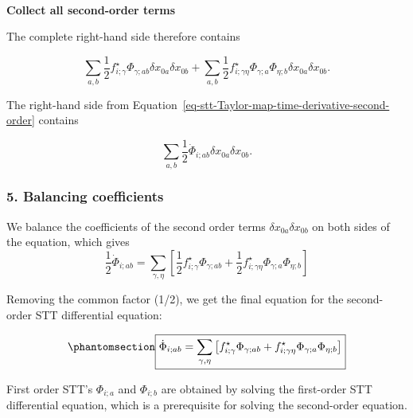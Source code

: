 \documentclass[
  letterpaper,
  DIV=11,
  numbers=noendperiod,
  oneside]{scrartcl}
\makeatletter
\let\oldparagraph\paragraph
\renewcommand{\paragraph}{
    \@ifstar
      \xxxParagraphStar
      \xxxParagraphNoStar
  }
\newcommand{\xxxParagraphStar}[1]{\oldparagraph*{#1}\mbox{}}
\newcommand{\xxxParagraphNoStar}[1]{\oldparagraph{#1}\mbox{}}
\makeatother
\begin{document}
\paragraph{\texorpdfstring{\textbf{Collect all second-order
terms}}{Collect all second-order terms}}\label{collect-all-second-order-terms}

The complete right-hand side therefore contains

\[
\sum_{a,b}\frac12
f^\star_{i;\gamma}
\Phi_{\gamma;ab}
\delta x_{0a}\delta x_{0b}
+
\sum_{a,b}\frac12
f^\star_{i;\gamma\eta}
\Phi_{\gamma;a}
\Phi_{\eta;b}
\delta x_{0a}\delta x_{0b}.
\]

The right-hand side from
Equation~\ref{eq-stt-Taylor-map-time-derivative-second-order} contains

\[
\sum_{a,b}\frac12
\dot\Phi_{i;ab}
\delta x_{0a}\delta x_{0b}.
\]

\subsubsection{5. Balancing
coefficients}\label{balancing-coefficients-1}

We balance the coefficients of the second order terms
\(\delta x_{0a}\delta x_{0b}\) on both sides of the equation, which
gives \[
\frac12\dot\Phi_{i;ab}=\sum_{\gamma,\eta}\left[\frac12f^\star_{i;\gamma}\Phi_{\gamma;ab}+\frac12f^\star_{i;\gamma\eta}\Phi_{\gamma;a}\Phi_{\eta;b}\right]
\]

Removing the common factor (1/2), we get the final equation for the
second-order STT differential equation:

\begin{equation}\protect\phantomsection\label{eq-second-order-stt-differential-equation}{
\boxed{
\dot\Phi_{i;ab}=\sum_{\gamma, \eta}\left[f^\star_{i;\gamma}\Phi_{\gamma;ab}+f^\star_{i;\gamma\eta}\Phi_{\gamma;a}\Phi_{\eta;b}\right]}
}\end{equation}

First order STT's \(\Phi_{i;a}\) and \(\Phi_{i;b}\) are obtained by
solving the first-order STT differential equation, which is a
prerequisite for solving the second-order equation.
\end{document}
